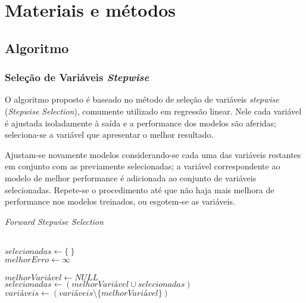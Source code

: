 \chapter[Materiais e métodos]{Materiais e métodos}

\section{Algoritmo}

\subsection{Seleção de Variáveis \textit{Stepwise}}

O algoritmo proposto é baseado no método de seleção de variáveis \textit{stepwise} (\textit{Stepwise Selection}), 
comumente utilizado em regressão linear. Nele cada variável é ajustada isoladamente à saída e a performance dos 
modelos são aferidas; seleciona-se a variável que apresentar o melhor resultado. 

Ajustam-se novamente modelos considerando-se cada uma das variáveis restantes em conjunto com as previamente 
selecionadas; a variável correspondente ao modelo de melhor performance é adicionada ao conjunto de variáveis 
selecionadas. Repete-se o procedimento até que não haja mais melhora de performance nos modelos treinados, ou 
esgotem-se as variáveis.

\begin{algorithm}
    \caption{\textit{Forward Stepwise Selection}}
    \ \\
    $selecionadas \gets \{\ \}$ \\
    $melhorErro \gets \infty$ \\
    \ \\
    {   
        $melhorVariável \gets NULL$ \\     
        $selecionadas \gets (melhorVariável \cup selecionadas)$ \\
        $variáveis \gets (variáveis \setminus \{melhorVariável\})$ \\
    }
\end{algorithm}


